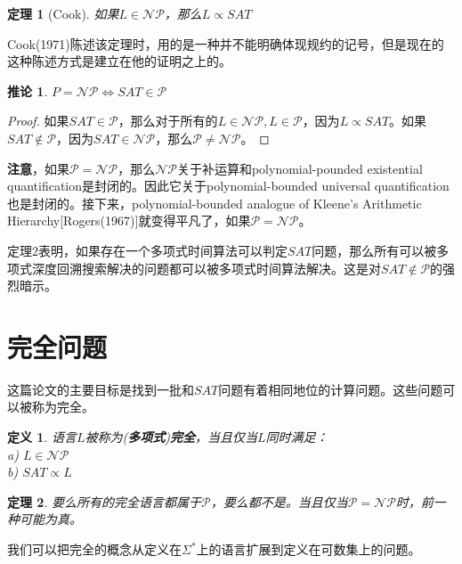\documentclass[twocolumn]{article}
\newtheorem{definition}{\hspace{2em}定义}
\newtheorem{theorem}{\hspace{2em}定理}
\newtheorem{corollary}{\hspace{2em}推论}
\theoremstyle{nonumberplain}%
\newtheorem{proof}{\hspace{2em}证明}
\begin{document}
    \begin{theorem}[Cook]
        如果$L\in\mathcal{NP}$，那么$L\propto SAT$
    \end{theorem}

    Cook(1971)陈述该定理时，用的是一种并不能明确体现规约的记号，但是现在的这种陈述方式是建立在他的证明之上的。

    \begin{corollary}
        $P=\mathcal{NP} \Leftrightarrow SAT \in \mathcal{P}$
    \end{corollary}

    \begin{proof}
      如果$SAT\in\mathcal{P}$，那么对于所有的$L\in\mathcal{NP},L\in\mathcal{P}$，因为$L \propto SAT$。如果$SAT\not\in\mathcal{P}$，因为$SAT\in\mathcal{NP}$，那么$\mathcal{P}\neq\mathcal{NP}$。
    \end{proof}

    {\bf 注意}，如果$\mathcal{P}=\mathcal{NP}$，那么$\mathcal{NP}$关于补运算和polynomial-pounded existential quantification是封闭的。因此它关于polynomial-bounded universal quantification也是封闭的。接下来，polynomial-bounded analogue of Kleene's Arithmetic Hierarchy[Rogers(1967)]就变得平凡了，如果$\mathcal{P}=\mathcal{NP}$。

    定理2表明，如果存在一个多项式时间算法可以判定$SAT$问题，那么所有可以被多项式深度回溯搜索解决的问题都可以被多项式时间算法解决。这是对$SAT\not\in\mathcal{P}$的强烈暗示。

\section{完全问题}
    这篇论文的主要目标是找到一批和$SAT$问题有着相同地位的计算问题。这些问题可以被称为完全。
    \begin{definition}
        语言$L$被称为({\bf 多项式}){\bf 完全}，当且仅当$L$同时满足：\\
        \indent a) $L\in\mathcal{NP}$\\
        \indent b) $SAT\propto L$\\
    \end{definition}

    \begin{theorem}
        要么所有的完全语言都属于$\mathcal{P}$，要么都不是。当且仅当$\mathcal{P}=\mathcal{NP}$时，前一种可能为真。
    \end{theorem}

    我们可以把完全的概念从定义在$\Sigma^*$上的语言扩展到定义在可数集上的问题。
\end{document}
